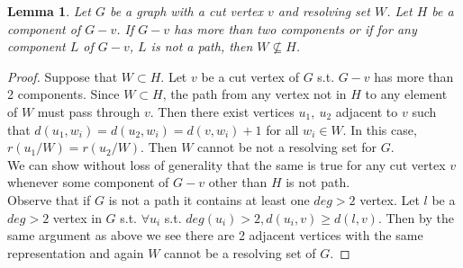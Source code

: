 \documentclass[11pt]{amsart}
\theoremstyle{plain}  %
\newtheorem{lem}[thm]{Lemma}
\theoremstyle{definition}
\theoremstyle{remark}
\numberwithin{equation}{thm}
\begin{document}
 
\begin{lem}
 Let $G$ be a graph with a cut vertex $v$ and resolving set $W$. Let $H$ be a component of $G-v$. 
 If $G-v$ has more than two components or if for any component $L$ of $G-v$, $L$ is not a path, then $W\nsubseteq H$.
\end{lem}
\begin{proof}
 Suppose that $W \subset H$. 
 Let $v$ be a cut vertex of $G$ s.t. $G-v$ has more than 2 components. Since $W \subset H$, the path from any vertex not in $H$ to any element of $W$ must pass through $v$.
 Then there exist vertices $u_1,\ u_2$ adjacent to $v$ such that $d(u_1, w_i) = d(u_2, w_i) = d(v, w_i) + 1$ for all $w_i \in W$.
 In this case, $r(u_1/W) = r(u_2/W)$. Then $W$ cannot be not a resolving set for $G$.\\
 We can show without loss of generality that the same is true for any cut vertex $v$ whenever some component of $G-v$ other than $H$ is not path.\\
 Observe that if $G$ is not a path it contains at least one $deg > 2$ vertex. 
 Let $l$ be a $deg > 2$ vertex in $G$ s.t. $\forall u_i$ s.t. $deg(u_i)>2, d(u_i, v) \geq d(l, v)$. 
 Then by the same argument as above we see there are 2 adjacent vertices with the same representation and again $W$ cannot be a resolving set of $G$.
 \end{proof}

 






\cite{Chartrand:2010:GDF:1941879}
\nocite{*}

\end{document}
